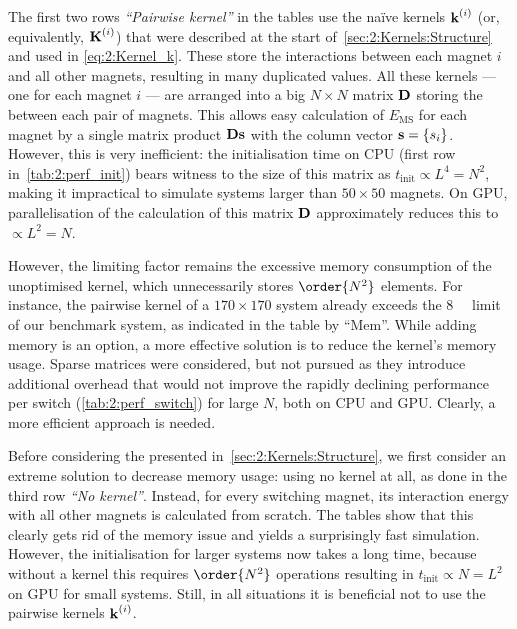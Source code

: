 The first two rows \textit{``Pairwise kernel''} in the tables use the na\"ive kernels $\boldsymbol{\mathbf{k}}^{(i)}$ (or, equivalently, $\boldsymbol{\mathbf{K}}^{(i)}$) that were described at the start of~\cref{sec:2:Kernels:Structure} and used in \cref{eq:2:Kernel_k}.
These store the interactions between each magnet $i$ and all other magnets, resulting in many duplicated values.
All these kernels --- one for each magnet $i$ --- are arranged into a big $N \times N$ matrix $\boldsymbol{\mathbf{D}}$ storing the  between each pair of magnets.
This allows easy calculation of $E_\mathrm{MS}$ for each magnet by a single matrix product $\boldsymbol{\mathbf{D}}\boldsymbol{\mathbf{s}}$ with the column vector $\boldsymbol{\mathbf{s}}=\{s_i\}$.
However, this is very inefficient: the initialisation time on CPU (first row in~\cref{tab:2:perf_init}) bears witness to the size of this matrix as $t_\mathrm{init} \propto L^4 = N^2$, making it impractical to simulate systems larger than $50 \times 50$ magnets.
On GPU, parallelisation of the calculation of this matrix $\boldsymbol{\mathbf{D}}$ approximately reduces this to $\propto L^2 = N$. \par
However, the limiting factor remains the excessive memory consumption of the unoptimised kernel, which unnecessarily stores $\order{N^2}$ elements. %
For instance, the pairwise kernel of a $170 \times 170$ system already exceeds the \SI{8}{\giga\byte} limit of our benchmark system, as indicated in the table by ``Mem''.
While adding memory is an option, a more effective solution is to reduce the kernel's memory usage.
Sparse matrices were considered, but not pursued as they introduce additional overhead that would not improve the rapidly declining performance per switch (\cref{tab:2:perf_switch}) for large $N$, both on CPU and GPU. %
Clearly, a more efficient approach is needed. \\\par

Before considering the  presented in~\cref{sec:2:Kernels:Structure}, we first consider an extreme solution to decrease memory usage: using no kernel at all, as done in the third row \textit{``No kernel''}.
Instead, for every switching magnet, its interaction energy with all other magnets is calculated from scratch.
The tables show that this clearly gets rid of the memory issue and yields a surprisingly fast simulation.
However, the initialisation for larger systems now takes a long time, because without a kernel this requires $\order{N^2}$ operations resulting in $t_\mathrm{init} \propto N=L^2$ on GPU for small systems.
Still, in all situations it is beneficial not to use the pairwise kernels $\boldsymbol{\mathbf{k}}^{(i)}$. \\\par

